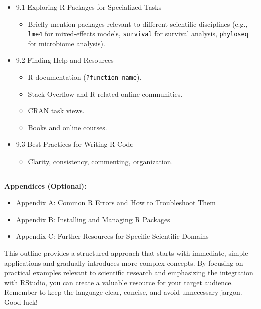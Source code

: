 \documentclass[
  letterpaper,
  DIV=11,
  numbers=noendperiod]{scrreprt}
\providecommand{\tightlist}{%
  \setlength{\itemsep}{0pt}\setlength{\parskip}{0pt}}\usepackage{longtable,booktabs,array}
\begin{document}
\begin{itemize}
\tightlist
\item
  9.1 Exploring R Packages for Specialized Tasks

  \begin{itemize}
  \tightlist
  \item
    Briefly mention packages relevant to different scientific
    disciplines (e.g., \texttt{lme4} for mixed-effects models,
    \texttt{survival} for survival analysis, \texttt{phyloseq} for
    microbiome analysis).
  \end{itemize}
\item
  9.2 Finding Help and Resources

  \begin{itemize}
  \tightlist
  \item
    R documentation (\texttt{?function\_name}).
  \item
    Stack Overflow and R-related online communities.
  \item
    CRAN task views.
  \item
    Books and online courses.
  \end{itemize}
\item
  9.3 Best Practices for Writing R Code

  \begin{itemize}
  \tightlist
  \item
    Clarity, consistency, commenting, organization.
  \end{itemize}
\end{itemize}

\begin{center}\rule{0.5\linewidth}{0.5pt}\end{center}

\textbf{Appendices (Optional):}

\begin{itemize}
\tightlist
\item
  Appendix A: Common R Errors and How to Troubleshoot Them
\item
  Appendix B: Installing and Managing R Packages
\item
  Appendix C: Further Resources for Specific Scientific Domains
\end{itemize}

This outline provides a structured approach that starts with immediate,
simple applications and gradually introduces more complex concepts. By
focusing on practical examples relevant to scientific research and
emphasizing the integration with RStudio, you can create a valuable
resource for your target audience. Remember to keep the language clear,
concise, and avoid unnecessary jargon. Good luck!
\end{document}
